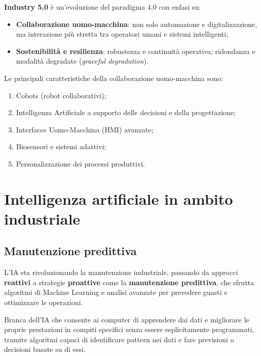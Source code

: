\textbf{Industry 5.0} è un'evoluzione del paradigma 4.0 con enfasi su:
\begin{itemize}
    \item \textbf{Collaborazione uomo-macchina}: non solo automazione e digitalizzazione, ma interazione più stretta tra operatori umani e sistemi intelligenti;
    \item \textbf{Sostenibilità e resilienza}: robustezza e continuità operativa; ridondanza e modalità degradate (\emph{graceful degradation}).
\end{itemize}

Le principali caratteristiche della collaborazione uomo-macchina sono:
\begin{enumerate}
    \item Cobots (robot collaborativi);
    \item Intelligenza Artificiale a supporto delle decisioni e della progettazione;
    \item Interfacce Uomo-Macchina (HMI) avanzate;
    \item Biosensori e sistemi adattivi;
    \item Personalizzazione dei processi produttivi.
\end{enumerate}

\section{Intelligenza artificiale in ambito industriale}
\subsection{Manutenzione predittiva}
L'IA sta rivoluzionando la manutenzione industriale, passando da approcci \textbf{reattivi} a strategie \textbf{proattive} come la \textbf{manutenzione predittiva}, che sfrutta algoritmi di Machine Learning e analisi avanzate per prevedere guasti e ottimizzare le operazioni.

\begin{defn}
Branca dell'IA che consente ai computer di apprendere dai dati e migliorare le proprie prestazioni in compiti specifici senza essere esplicitamente programmati, tramite algoritmi capaci di identificare pattern nei dati e fare previsioni o decisioni basate su di essi.
\end{defn}

